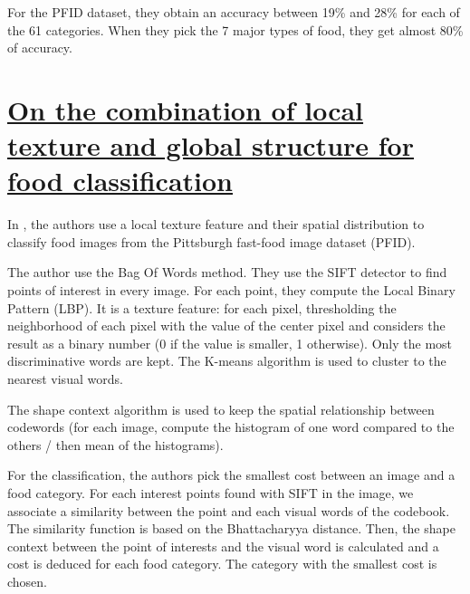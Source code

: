 For the PFID dataset, they obtain an accuracy between 19\% and 28\% for each of the 61 categories.
When they pick the 7 major types of food, they get almost 80\% of accuracy.

\section{\href{http://ieeexplore.ieee.org/lpdocs/epic03/wrapper.htm?arnumber=5693842}{On the combination of local texture and global structure for food classification}}

In \cite{Zong2010}, the authors use a local texture feature and their spatial distribution to classify food images from the Pittsburgh fast-food image dataset (PFID).

The author use the Bag Of Words method. They use the SIFT detector to find points of interest in every image. For each point, they compute the Local Binary Pattern (LBP). It is a  texture feature: for each pixel, thresholding the neighborhood of each pixel with the value of the center pixel and considers the result as a binary number (0 if the value is smaller, 1 otherwise).  Only the most discriminative words are kept. The K-means algorithm is used to cluster to the nearest visual words.

The shape context algorithm is used to keep the spatial relationship between codewords (for each image, compute the histogram of one word compared to the others / then mean of the histograms).

For the classification, the authors pick the smallest cost between an image and a food category. For each interest points found with SIFT in the image, we associate a similarity between the point and each visual words of the codebook. The similarity function is based on the Bhattacharyya distance. Then, the shape context between the point of interests and the visual word is calculated and a cost is deduced for each food category. The category with the smallest cost is chosen.



